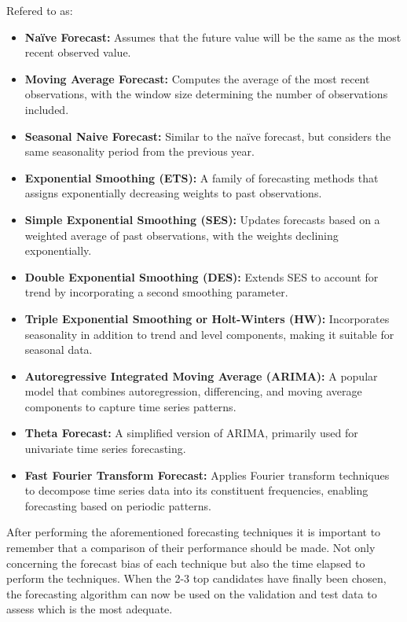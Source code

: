 \documentclass{article}
\begin{document}
Refered to as:
\begin{itemize}
    \item \textbf{Naïve Forecast:} Assumes that the future value will be the same as the most recent observed value.
    \item \textbf{Moving Average Forecast:} Computes the average of the most recent observations, with the window size determining the number of observations included.
    \item \textbf{Seasonal Naive Forecast:} Similar to the naïve forecast, but considers the same seasonality period from the previous year.
    \item \textbf{Exponential Smoothing (ETS):} A family of forecasting methods that assigns exponentially decreasing weights to past observations.
    \item \textbf{Simple Exponential Smoothing (SES):} Updates forecasts based on a weighted average of past observations, with the weights declining exponentially.
    \item \textbf{Double Exponential Smoothing (DES):} Extends SES to account for trend by incorporating a second smoothing parameter.
    \item \textbf{Triple Exponential Smoothing or Holt-Winters (HW):} Incorporates seasonality in addition to trend and level components, making it suitable for seasonal data.
    \item \textbf{Autoregressive Integrated Moving Average (ARIMA):} A popular model that combines autoregression, differencing, and moving average components to capture time series patterns.
    \item \textbf{Theta Forecast:} A simplified version of ARIMA, primarily used for univariate time series forecasting.
    \item \textbf{Fast Fourier Transform Forecast:} Applies Fourier transform techniques to decompose time series data into its constituent frequencies, enabling forecasting based on periodic patterns.

\end{itemize}

After performing the aforementioned forecasting techniques it is important to remember that a comparison of their performance should be made. Not only concerning the forecast bias of each technique but also the time elapsed to perform the techniques.
When the 2-3 top candidates have finally been chosen, the forecasting algorithm can now be used on the validation and test data to assess which is the most adequate. 
\end{document}
